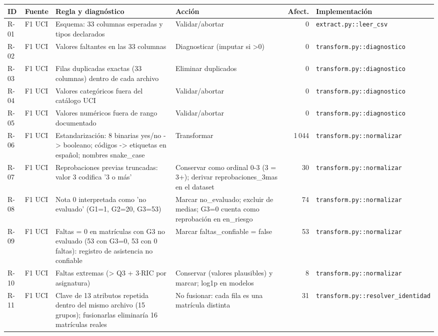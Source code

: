 \begin{tabular}{>{\raggedright\arraybackslash}p{1.0cm}>{\raggedright\arraybackslash}p{1.9cm}>{\raggedright\arraybackslash}p{8.6cm}>{\raggedright\arraybackslash}p{4.4cm}r>{\raggedright\arraybackslash}p{4.6cm}}
\toprule
ID & Fuente & Regla y diagnóstico & Acción & Afect. & Implementación \\
\midrule
R-01 & F1 UCI & Esquema: 33 columnas esperadas y tipos declarados & Validar/abortar & 0 & \texttt{extract.py::\allowbreak leer\_csv} \\
R-02 & F1 UCI & Valores faltantes en las 33 columnas & Diagnosticar (imputar si >0) & 0 & \texttt{transform.py::\allowbreak diagnostico} \\
R-03 & F1 UCI & Filas duplicadas exactas (33 columnas) dentro de cada archivo & Eliminar duplicados & 0 & \texttt{transform.py::\allowbreak diagnostico} \\
R-04 & F1 UCI & Valores categóricos fuera del catálogo UCI & Validar/abortar & 0 & \texttt{transform.py::\allowbreak diagnostico} \\
R-05 & F1 UCI & Valores numéricos fuera de rango documentado & Validar/abortar & 0 & \texttt{transform.py::\allowbreak diagnostico} \\
R-06 & F1 UCI & Estandarización: 8 binarias yes/no -> booleano; códigos -> etiquetas en español; nombres snake\_case & Transformar & 1\,044 & \texttt{transform.py::\allowbreak normalizar} \\
R-07 & F1 UCI & Reprobaciones previas truncadas: valor 3 codifica '3 o más' & Conservar como ordinal 0-3 (3 = 3+); derivar reprobaciones\_3mas en el dataset & 30 & \texttt{transform.py::\allowbreak normalizar} \\
R-08 & F1 UCI & Nota 0 interpretada como 'no evaluado' (G1=1, G2=20, G3=53) & Marcar no\_evaluado; excluir de medias; G3=0 cuenta como reprobación en en\_riesgo & 74 & \texttt{transform.py::\allowbreak normalizar} \\
R-09 & F1 UCI & Faltas = 0 en matrículas con G3 no evaluado (53 con G3=0, 53 con 0 faltas): registro de asistencia no confiable & Marcar faltas\_confiable = false & 53 & \texttt{transform.py::\allowbreak normalizar} \\
R-10 & F1 UCI & Faltas extremas (> Q3 + 3$\cdot$RIC por asignatura) & Conservar (valores plausibles) y marcar; log1p en modelos & 8 & \texttt{transform.py::\allowbreak normalizar} \\
R-11 & F1 UCI & Clave de 13 atributos repetida dentro del mismo archivo (15 grupos); fusionarlas eliminaría 16 matrículas reales & No fusionar: cada fila es una matrícula distinta & 31 & \texttt{transform.py::\allowbreak resolver\_identidad} \\

\end{tabular}
